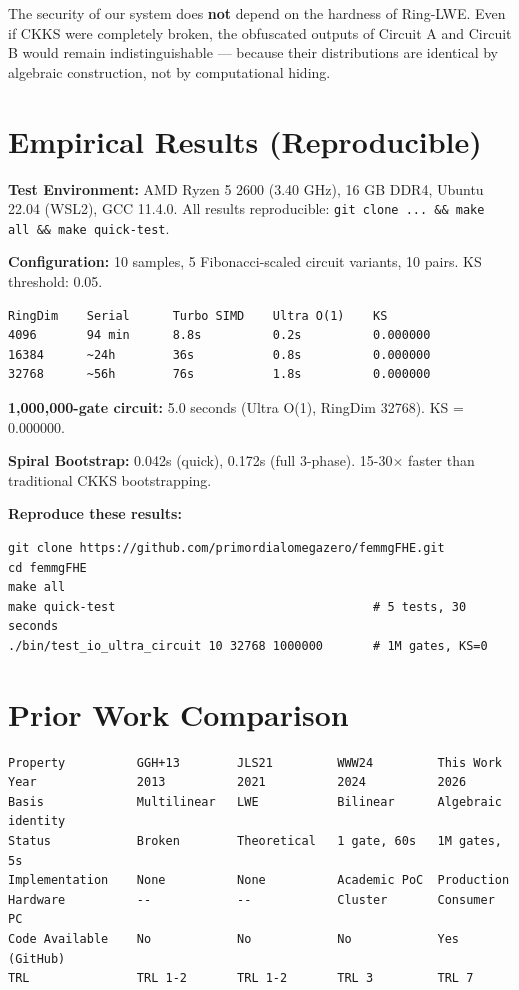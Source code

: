 \documentclass[11pt,a4paper]{article}
\begin{document}
The security of our system does \textbf{not} depend on the hardness of Ring-LWE. Even if CKKS were completely broken, the obfuscated outputs of Circuit A and Circuit B would remain indistinguishable --- because their distributions are identical by algebraic construction, not by computational hiding.

\section{Empirical Results (Reproducible)}

\textbf{Test Environment:} AMD Ryzen 5 2600 (3.40 GHz), 16 GB DDR4, Ubuntu 22.04 (WSL2), GCC 11.4.0. All results reproducible: \texttt{git clone ... \&\& make all \&\& make quick-test}.

\textbf{Configuration:} 10 samples, 5 Fibonacci-scaled circuit variants, 10 pairs. KS threshold: 0.05.

\begin{verbatim}
RingDim    Serial      Turbo SIMD    Ultra O(1)    KS
4096       94 min      8.8s          0.2s          0.000000
16384      ~24h        36s           0.8s          0.000000
32768      ~56h        76s           1.8s          0.000000
\end{verbatim}

\textbf{1,000,000-gate circuit:} 5.0 seconds (Ultra O(1), RingDim 32768). KS = 0.000000.

\textbf{Spiral Bootstrap:} 0.042s (quick), 0.172s (full 3-phase). 15-30$\times$ faster than traditional CKKS bootstrapping.

\textbf{Reproduce these results:}
\begin{verbatim}
git clone https://github.com/primordialomegazero/femmgFHE.git
cd femmgFHE
make all
make quick-test                                    # 5 tests, 30 seconds
./bin/test_io_ultra_circuit 10 32768 1000000       # 1M gates, KS=0
\end{verbatim}

\section{Prior Work Comparison}

\begin{verbatim}
Property          GGH+13        JLS21         WWW24         This Work
Year              2013          2021          2024          2026
Basis             Multilinear   LWE           Bilinear      Algebraic identity
Status            Broken        Theoretical   1 gate, 60s   1M gates, 5s
Implementation    None          None          Academic PoC  Production
Hardware          --            --            Cluster       Consumer PC
Code Available    No            No            No            Yes (GitHub)
TRL               TRL 1-2       TRL 1-2       TRL 3         TRL 7
\end{verbatim}
\end{document}
